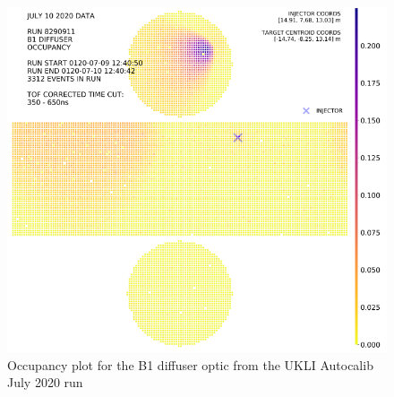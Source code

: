 \begin{figure}
\begin{minipage}{0.47\textwidth}
        \includegraphics[width=\textwidth]{Figures/B1_occupancy_diff_auto.PNG} %
        \caption{Occupancy plot for the B1 diffuser optic from the UKLI Autocalib July 2020 run}
        \label{fig:B1_coll_diff_auto_July}
    \end{minipage}
\end{figure}


